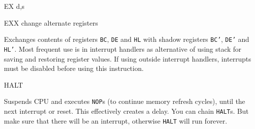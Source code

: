 \documentclass[12pt,twoside,openright,a4paper]{book}
\begin{document}
\begin{basedescript}{
	\desclabelstyle{\multilinelabel}
	\desclabelwidth{3cm}}
\begin{DetailItem}{EX d,s}
		\begin{DetailEffects}
			\FlagsEXrr[No effect]
			\FlagsEXaf[{\tt EX AF,AF'}]
		\end{DetailEffects}
						
		\begin{DetailTiming}
			\DetailTime[rr,rr]{1}{4}
			\DetailTime[(SP),HL]{5}{19}
			\DetailTime[(SP),IX]{6}{23}
			\DetailTime[(SP),IY]{6}{23}
		\end{DetailTiming}

	\end{DetailItem}

	\begin{DetailItem}{EXX}
		{change alternate registers}
		{\SymEXX}

		Exchanges contents of registers {\tt BC}, {\tt DE} and {\tt HL} with shadow registers {\tt BC'}, {\tt DE'} and {\tt HL'}. Most frequent use is in interrupt handlers as alternative of using stack for saving and restoring register values. If using outside interrupt handlers, interrupts must be disabled before using this instruction.

		\begin{DetailEffects}
			\FlagsEXX
		\end{DetailEffects}
				
		\begin{DetailTiming}
			\DetailTime{1}{4}
		\end{DetailTiming}

	\end{DetailItem}

	\pagebreak
	\begin{DetailItem}{HALT}
		{\IH{HALT}}
		{}

		Suspends CPU and executes {\tt NOP}s (to continue memory refresh cycles), until the next interrupt or reset. This effectively creates a delay. You can chain {\tt HALT}s. But make sure that there will be an interrupt, otherwise {\tt HALT} will run forever.

		\begin{DetailEffects}
			\FlagsHALT
		\end{DetailEffects}
						
		\begin{DetailTiming}
		\end{DetailTiming}

	\end{DetailItem}


\end{basedescript}
\end{document}
